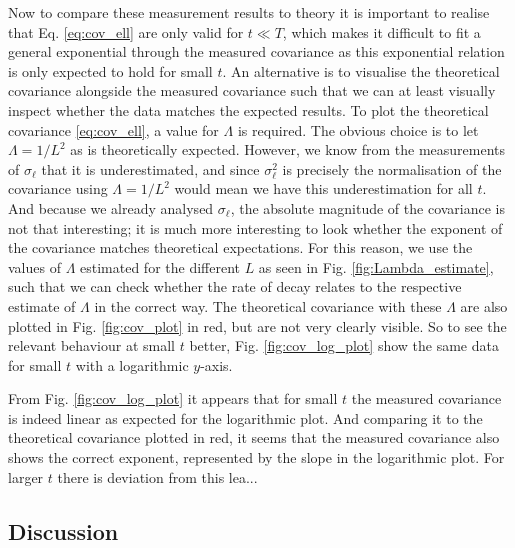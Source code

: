Now to compare these measurement results to theory it is important to realise that Eq. \eqref{eq:cov_ell} are only valid for $t \ll T$, which makes it difficult to fit a general exponential through the measured covariance as this exponential relation is only expected to hold for small $t$.
An alternative is to visualise the theoretical covariance alongside the measured covariance such that we can at least visually inspect whether the data matches the expected results.
To plot the theoretical covariance \eqref{eq:cov_ell}, a value for $\Lambda$ is required.
The obvious choice is to let $\Lambda = 1/L^2$ as is theoretically expected.
However, we know from the measurements of $\sigma_\ell$ that it is underestimated, and since $\sigma_\ell^2$ is precisely the normalisation of the covariance using $\Lambda = 1/L^2$ would mean we have this underestimation for all $t$.
And because we already analysed $\sigma_\ell$, the absolute magnitude of the covariance is not that interesting; it is much more interesting to look whether the exponent of the covariance matches theoretical expectations.
For this reason, we use the values of $\Lambda$ estimated for the different $L$ as seen in Fig. \ref{fig:Lambda_estimate}, such that we can check whether the rate of decay relates to the respective estimate of $\Lambda$ in the correct way.
The theoretical covariance with these $\Lambda$ are also plotted in Fig. \ref{fig:cov_plot} in red, but are not very clearly visible.
So to see the relevant behaviour at small $t$ better, Fig. \ref{fig:cov_log_plot} show the same data for small $t$ with a logarithmic $y$-axis.

From Fig. \ref{fig:cov_log_plot} it appears that for small $t$ the measured covariance is indeed linear as expected for the logarithmic plot. And comparing it to the theoretical covariance plotted in red, it seems that the measured covariance also shows the correct exponent, represented by the slope in the logarithmic plot.
For larger $t$ there is deviation from this lea... %
% 



\subsection{Discussion}
